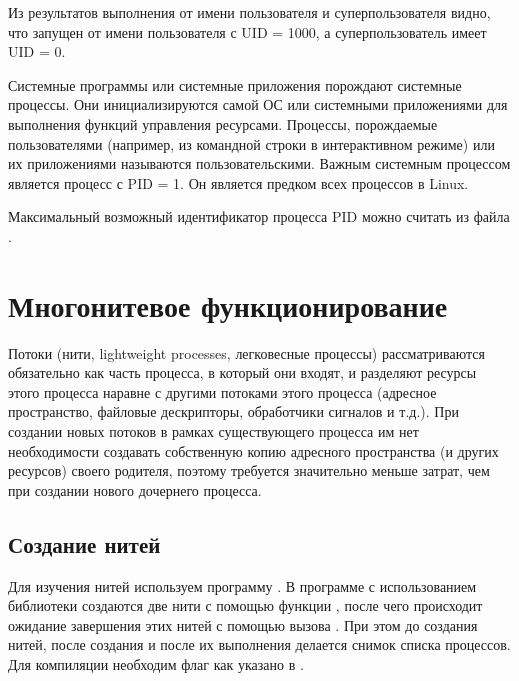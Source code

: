 

Из результатов выполнения  от имени пользователя и суперпользователя видно, что  запущен от имени пользователя с UID = 1000, а суперпользователь имеет UID = 0.

Системные программы или системные приложения порождают системные процессы. Они инициализируются самой ОС или системными приложениями для выполнения функций управления ресурсами. Процессы, порождаемые пользователями (например, из командной строки в интерактивном режиме) или их приложениями называются пользовательскими. Важным системным процессом является процесс  с PID = 1. Он является предком всех процессов в Linux.

Максимальный возможный идентификатор процесса PID можно считать из файла .


\section{Многонитевое функционирование}

Потоки (нити, lightweight processes, легковесные процессы) рассматриваются обязательно как часть процесса, в который они входят, и разделяют ресурсы этого процесса наравне с другими потоками этого процесса (адресное пространство, файловые дескрипторы, обработчики сигналов и т.д.). При создании новых потоков в рамках существующего процесса им нет необходимости создавать собственную копию адресного пространства (и других ресурсов) своего родителя, поэтому требуется значительно меньше затрат, чем при создании нового дочернего процесса.

\subsection{Создание нитей}

Для изучения нитей используем программу . В программе с использованием библиотеки  создаются две нити с помощью функции , после чего происходит ожидание завершения этих нитей с помощью вызова . При этом до создания нитей, после создания и после их выполнения делается снимок списка процессов. Для компиляции необходим флаг  как указано в .





